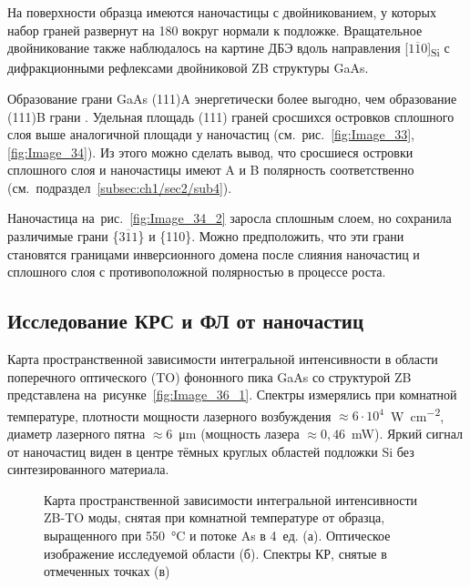 На поверхности образца имеются наночастицы с двойникованием, у которых набор
граней развернут на 180{\textdegree} вокруг нормали к подложке. Вращательное
двойникование также наблюдалось на картине ДБЭ вдоль направления
[\(1\overline{1}0\)]\textsubscript{Si} с дифракционными рефлексами двойниковой
ZB структуры GaAs.

Образование грани GaAs (111)A энергетически более выгодно, чем образование
(111)B грани \cite{Tomioka2009, wong2010}. Удельная площадь (111) граней
сросшихся островков сплошного слоя выше аналогичной площади у наночастиц
(см.~рис.~\cref{fig:Image_33}, \cref{fig:Image_34}). Из этого можно сделать
вывод, что сросшиеся островки сплошного слоя и наночастицы имеют A и B
полярность соответственно (см.~подраздел~\cref{subsec:ch1/sec2/sub4}).

Наночастица на~рис.~\cref{fig:Image_34_2} заросла сплошным слоем, но сохранила
различимые грани \{\(3\overline{1}1\)\} и \{110\}. Можно предположить, что эти
грани становятся границами инверсионного домена после слияния наночастиц и
сплошного слоя с противоположной полярностью в процессе роста.

\subsection{Исследование КРС и ФЛ от наночастиц}\label{subsec:ch5/sec2/sub3}

Карта пространственной зависимости интегральной интенсивности в области
поперечного оптического (TO) фононного пика GaAs со структурой ZB представлена
на~рисунке~\cref{fig:Image_36_1}. Спектры измерялись при комнатной температуре,
плотности мощности лазерного возбуждения \(\approx 6 \cdot
10^4\)~\si{\watt\per\centi\metre\squared}, диаметр лазерного пятна \(\approx
6\)~\si{\micro\metre} (мощность лазера \(\approx 0,46\)~\si{\milli\watt}).
Яркий сигнал от наночастиц виден в центре тёмных круглых областей подложки Si
без синтезированного материала.

\begin{figure}[ht]  
		\caption{Карта пространственной зависимости интегральной интенсивности
			ZB-TO моды, снятая при комнатной температуре от образца, выращенного при
			550~\si{\degreeCelsius} и потоке As в 4~ед. (а). Оптическое изображение
	исследуемой области (б). Спектры КР, снятые в отмеченных точках
	(в)}\label{fig:Image_36} \end{figure}

